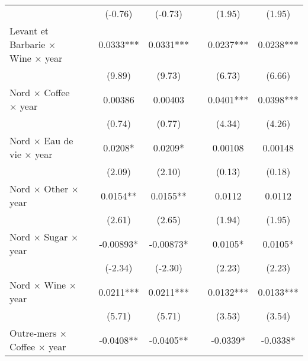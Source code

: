 {\begin{tabular}{l*{6}{c}}
                    &                     &     (-0.76)         &     (-0.73)         &                     &      (1.95)         &      (1.95)         \\
[1em]
Levant et Barbarie $\times$ Wine $\times$ year&                     &      0.0333***&      0.0331***&                     &      0.0237***&      0.0238***\\
                    &                     &      (9.89)         &      (9.73)         &                     &      (6.73)         &      (6.66)         \\
[1em]
Nord $\times$ Coffee $\times$ year&                     &     0.00386         &     0.00403         &                     &      0.0401***&      0.0398***\\
                    &                     &      (0.74)         &      (0.77)         &                     &      (4.34)         &      (4.26)         \\
[1em]
Nord $\times$ Eau de vie $\times$ year&                     &      0.0208*  &      0.0209*  &                     &     0.00108         &     0.00148         \\
                    &                     &      (2.09)         &      (2.10)         &                     &      (0.13)         &      (0.18)         \\
[1em]
Nord $\times$ Other $\times$ year&                     &      0.0154** &      0.0155** &                     &      0.0112         &      0.0112         \\
                    &                     &      (2.61)         &      (2.65)         &                     &      (1.94)         &      (1.95)         \\
[1em]
Nord $\times$ Sugar $\times$ year&                     &    -0.00893*  &    -0.00873*  &                     &      0.0105*  &      0.0105*  \\
                    &                     &     (-2.34)         &     (-2.30)         &                     &      (2.23)         &      (2.23)         \\
[1em]
Nord $\times$ Wine $\times$ year&                     &      0.0211***&      0.0211***&                     &      0.0132***&      0.0133***\\
                    &                     &      (5.71)         &      (5.71)         &                     &      (3.53)         &      (3.54)         \\
[1em]
Outre-mers $\times$ Coffee $\times$ year&                     &     -0.0408** &     -0.0405** &                     &     -0.0339*  &     -0.0338*  \\

\end{tabular}}
